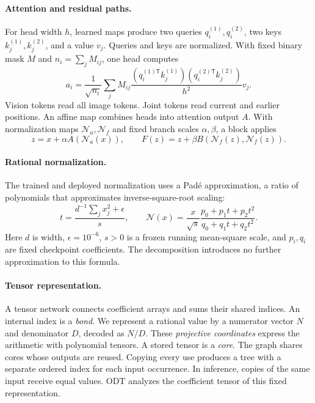 \documentclass{article}
\begin{document}
\paragraph{Attention and residual paths.}
For head width $h$, learned maps produce two queries $q_i^{(1)},q_i^{(2)}$, two keys $k_j^{(1)},k_j^{(2)}$, and a value $v_j$. Queries and keys are normalized. With fixed binary mask $M$ and $n_i=\sum_jM_{ij}$, one head computes
\begin{equation}
 a_i=\frac{1}{\sqrt{n_i}}\sum_jM_{ij}
 \frac{(q_i^{(1)\mathsf T}k_j^{(1)})(q_i^{(2)\mathsf T}k_j^{(2)})}{h^2}v_j.
 \label{eq.attention}
\end{equation}
Vision tokens read all image tokens. Joint tokens read current and earlier positions. An affine map combines heads into attention output $A$. With normalization maps $\mathcal N_a,\mathcal N_f$ and fixed branch scales $\alpha,\beta$, a block applies
\begin{equation}
 z=x+\alpha A(\mathcal N_a(x)),\qquad F(z)=z+\beta B(\mathcal N_f(z),\mathcal N_f(z)).
 \label{eq.block}
\end{equation}

\paragraph{Rational normalization.}
The trained and deployed normalization uses a Pad\'e approximation, a ratio of polynomials that approximates inverse-square-root scaling:
\begin{equation}
 t=\frac{d^{-1}\sum_jx_j^2+\epsilon}{s},\qquad
 \mathcal N(x)=\frac{x}{\sqrt{s}}\frac{p_0+p_1t+p_2t^2}{q_0+q_1t+q_2t^2}.
 \label{eq.norm}
\end{equation}
Here $d$ is width, $\epsilon=10^{-6}$, $s>0$ is a frozen running mean-square scale, and $p_i,q_i$ are fixed checkpoint coefficients. The decomposition introduces no further approximation to this formula.

\paragraph{Tensor representation.}
A tensor network connects coefficient arrays and sums their shared indices. An internal index is a \emph{bond}. We represent a rational value by a numerator vector $N$ and denominator $D$, decoded as $N/D$. These \emph{projective coordinates} express the arithmetic with polynomial tensors. A stored tensor is a \emph{core}. The graph shares cores whose outputs are reused. Copying every use produces a tree with a separate ordered index for each input occurrence. In inference, copies of the same input receive equal values. ODT analyzes the coefficient tensor of this fixed representation.
\end{document}
